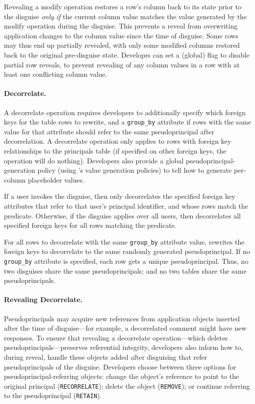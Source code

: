 %
Revealing a modify operation restores a row's column back to its state prior
to the disguise \emph{only if} the current column value matches the value
generated by the modify operation during the disguise. This prevents a reveal
from overwriting application changes to the column value since the time of
disguise.
%
Some rows may thus end up partially revealed, with only some modified columns
restored back to the original pre-disguise state.  Developrs can set a (global)
flag to disable partial row reveals, to prevent revealing of any column values
in a row with at least one conflicting column value.
%

%
\paragraph{Decorrelate.}
%
A decorrelate operation requires developers to additionally specify \one{} which
foreign keys for the table rows to rewrite, and \two{} a
\texttt{group\_by} attribute if rows with the same value for that attribute
should refer to the same pseudoprincipal after decorrelation.
%
A decorrelate operation only applies to rows with foreign key relationships to
the principals table (if specified on other foreign keys, the operation will do
nothing).
%
Developers also provide a global pseudoprincipal-generation policy
(using \sys's value generation policies) to tell \sys how to generate per-column
placeholder values.
%

%
If a user invokes the disguise, then \sys only decorrelates the specified
foreign key attributes that refer to that user's principal identifier, and whose
rows match the predicate. 
%
Otherwise, if the disguise applies over all users, then \sys decorrelates all
specified foreign keys for all rows matching the predicate.
%

%
For all rows to decorrelate with the same \texttt{group\_by} attribute value,
\sys rewrites the foreign keys to decorrelate to the same randomly generated
pseudoprincipal.
%
If no \texttt{group\_by} attribute is specified, each row gets a unique
pseudoprincipal.
%
Thus, no two disguises share the same pseudoprincipals; and no two tables share
the same pseudoprincipals.
%

%
\paragraph{Revealing Decorrelate.}
%
Pseudoprincipals may acquire new references from application objects inserted
after the time of disguise---for example, a decorrelated comment might have new
responses. To ensure that revealing a decorrelate operation---which deletes
pseudoprincipals---preserves referential integrity, developers also inform \sys
how to, during reveal, handle these objects added after disguising that refer
pseudoprincipals of the disguise. 
%
Developers choose between three options for
pseudoprincipal-referring objects: \one{} change the object's reference to point
to the original principal (\texttt{RECORRELATE}); \two{} delete the object
(\texttt{REMOVE}); or \three{} continue referring to the pseudoprincipal
(\texttt{RETAIN}).
%

